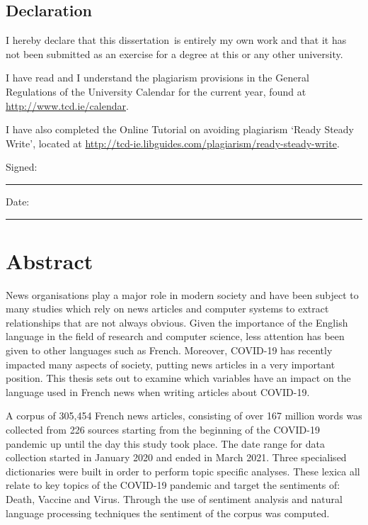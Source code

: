 \documentclass[a4paper,oneside,12pt]{book}
\title{\thesistitle}
\author{\authorname}
\newcommand{\typeofthesis}{dissertation} %
\begin{document}

\section*{\Huge{Declaration}}
\vspace{1cm}
I hereby declare that this \typeofthesis\ is entirely my own work and that it has not been submitted as an exercise for a degree at this or any other university.

\vspace{1cm}
I have read and I understand the plagiarism provisions in the General Regulations of the University Calendar for the current year, found at \url{http://www.tcd.ie/calendar}.
\vspace{1cm}

I have also completed the Online Tutorial on avoiding plagiarism `Ready Steady Write', located at \url{http://tcd-ie.libguides.com/plagiarism/ready-steady-write}.
\vspace{3cm}

Signed:~\rule{5cm}{0.3pt}\hfill Date:~\rule{5cm}{0.3pt}

\chapter*{Abstract}

News organisations play a major role in modern society and have been subject to many studies which rely on news articles and computer systems to extract relationships that are not always obvious. Given the importance of the English language in the field of research and computer science, less attention has been given to other languages such as French. Moreover, COVID-19 has recently impacted many aspects of society, putting news articles in a very important position. This thesis sets out to examine which variables have an impact on the language used in French news when writing articles about COVID-19.

A corpus of 305,454 French news articles, consisting of over 167 million words was collected from 226 sources starting from the beginning of the COVID-19 pandemic up until the day this study took place. The date range for data collection started in January 2020 and ended in March 2021. Three specialised dictionaries were built in order to perform topic specific analyses. These lexica all relate to key topics of the COVID-19 pandemic and target the sentiments of: Death, Vaccine and Virus. Through the use of sentiment analysis and natural language processing techniques the sentiment of the corpus was computed.
\end{document}
